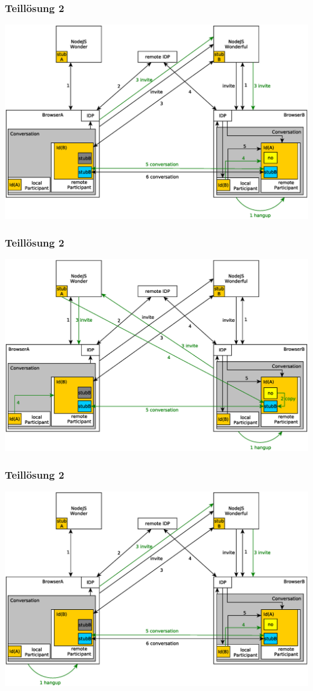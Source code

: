 \documentclass{beamer}
\begin{document}
\begin{frame}
	\frametitle{Teillösung 2}
	\includegraphics[scale=0.365,centered]{pictures/bye_bh_ab}
\end{frame}
\begin{frame}
	\frametitle{Teillösung 2}
	\includegraphics[scale=0.365,centered]{pictures/bye_bh_ba}
\end{frame}
\begin{frame}
	\frametitle{Teillösung 2}
	\includegraphics[scale=0.365,centered]{pictures/bye_ah_ab}
\end{frame}
\end{document}
